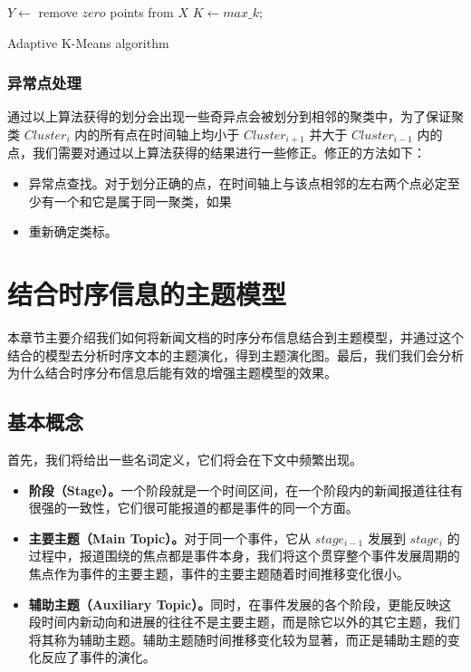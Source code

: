 \begin{algorithm}
  \DontPrintSemicolon
  \BlankLine
  $Y \longleftarrow$ remove $zero$ points from $X$\;
   {$K \leftarrow max\_k$;\;}
  \caption{Adaptive K-Means algorithm}
  \label{algo:ada-kmeans}
\end{algorithm}

\subsubsection{异常点处理}
通过以上算法获得的划分会出现一些奇异点会被划分到相邻的聚类中，为了保证聚类 $Cluster_i$ 内的所有点在时间轴上均小于 $Cluster_{i+1}$ 并大于 $Cluster_{i-1}$ 内的点，我们需要对通过以上算法获得的结果进行一些修正。修正的方法如下：
\begin{itemize}
\item 异常点查找。对于划分正确的点，在时间轴上与该点相邻的左右两个点必定至少有一个和它是属于同一聚类，如果
\item 重新确定类标。
\end{itemize}

\section{结合时序信息的主题模型}
本章节主要介绍我们如何将新闻文档的时序分布信息结合到主题模型，并通过这个结合的模型去分析时序文本的主题演化，得到主题演化图。最后，我们我们会分析为什么结合时序分布信息后能有效的增强主题模型的效果。
\subsection{基本概念}
\label{sec:concepts}
首先，我们将给出一些名词定义，它们将会在下文中频繁出现。
\begin{itemize}
\item \textbf{阶段（Stage）。}一个阶段就是一个时间区间，在一个阶段内的新闻报道往往有很强的一致性，它们很可能报道的都是事件的同一个方面。
\item \textbf{主要主题（Main Topic）。}对于同一个事件，它从 $stage_{i-1}$ 发展到 $stage_i$  的过程中，报道围绕的焦点都是事件本身，我们将这个贯穿整个事件发展周期的焦点作为事件的主要主题，事件的主要主题随着时间推移变化很小。
\item \textbf{辅助主题（Auxiliary Topic）。}同时，在事件发展的各个阶段，更能反映这段时间内新动向和进展的往往不是主要主题，而是除它以外的其它主题，我们将其称为辅助主题。辅助主题随时间推移变化较为显著，而正是辅助主题的变化反应了事件的演化。
\end{itemize}

